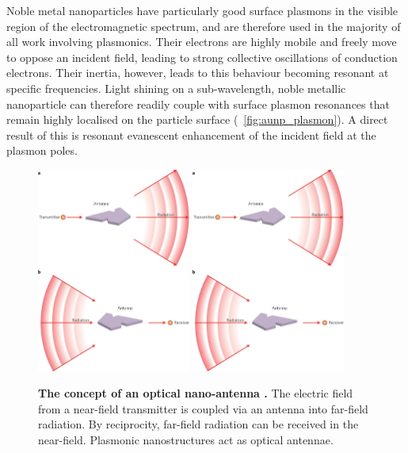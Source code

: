 \documentclass[12pt, a4paper, twoside]{book}
\begin{document}
Noble metal nanoparticles have particularly good surface plasmons in the visible region of the electromagnetic spectrum, and are therefore used in the majority of all work involving plasmonics. Their electrons are highly mobile and freely move to oppose an incident field, leading to strong collective oscillations of conduction electrons. Their inertia, however, leads to this behaviour becoming resonant at specific frequencies. Light shining on a sub-wavelength, noble metallic nanoparticle can therefore readily couple with surface plasmon resonances that remain highly localised on the particle surface (\figurename~\ref{fig:aunp_plasmon}). A direct result of this is resonant evanescent enhancement of the incident field at the plasmon poles.

\begin{figure}[bt]
\centering
	\includegraphics[width=0.45\textwidth, clip=true, trim=0 650 0 0]{figures/literature/nphoton_2010_237_f1}
	\includegraphics[width=0.45\textwidth, clip=true, trim=15 0 0 660]{figures/literature/nphoton_2010_237_f1}\\
\caption[The concept of an optical nano-antenna \cite{novotny2011}.]{\textbf{The concept of an optical nano-antenna \cite{novotny2011}.} The electric field from a near-field transmitter is coupled via an antenna into far-field radiation. By reciprocity, far-field radiation can be received in the near-field. Plasmonic nanostructures act as optical antennae.}
\label{fig:novotny2011}
\end{figure}
\end{document}
